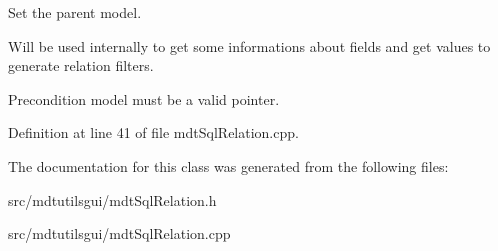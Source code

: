 Set the parent model. 

Will be used internally to get some informations about fields and get values to generate relation filters.

\begin{DoxyPrecond}{Precondition}
model must be a valid pointer. 
\end{DoxyPrecond}


Definition at line 41 of file mdtSqlRelation.cpp.



The documentation for this class was generated from the following files:\begin{DoxyCompactItemize}
\item 
src/mdtutilsgui/mdtSqlRelation.h\item 
src/mdtutilsgui/mdtSqlRelation.cpp\end{DoxyCompactItemize}
